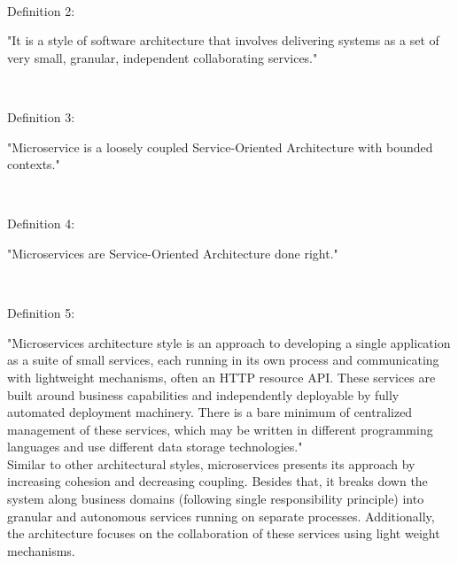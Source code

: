 \begin{enumerate}
\\
\begin{shaded}Definition 2: \cite{Wootton:2014aa}\end{shaded}
"It is a style of software architecture that involves delivering systems as a set of very small, granular, independent collaborating services."


\\
\begin{shaded}Definition 3: \cite{Cockcroft:2015aa}\end{shaded}
"Microservice is a loosely coupled Service-Oriented Architecture with bounded contexts."


\\
\begin{shaded}Definition 4: \cite{Fowler:2014aa}\cite{Radchenko:2015aa}\end{shaded}
"Microservices are Service-Oriented Architecture done right."


\\
\begin{shaded}Definition 5: \cite{Fowler:2014aa}\end{shaded}
"Microservices architecture style is an approach to developing a single application as a suite of small services, each running in its own process and communicating with lightweight mechanisms, often an HTTP resource API. These services are built around business capabilities and independently deployable by fully automated deployment machinery. There is a bare minimum of centralized management of these services, which may be written in different programming languages and use different data storage technologies."
\\
Similar to other architectural styles, microservices presents its approach by increasing cohesion and decreasing coupling. Besides that, it breaks down the system along business domains (following single responsibility principle) into granular and autonomous services running on separate processes. Additionally, the architecture focuses on the collaboration of these services using light weight mechanisms.


\end{enumerate}
